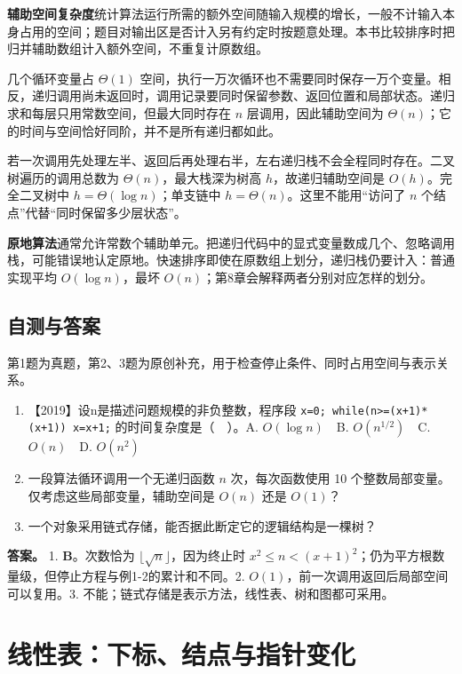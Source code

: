 \textbf{辅助空间复杂度}统计算法运行所需的额外空间随输入规模的增长，一般不计输入本身占用的空间；题目对输出区是否计入另有约定时按题意处理。本书比较排序时把归并辅助数组计入额外空间，不重复计原数组。

几个循环变量占 \(\Theta(1)\) 空间，执行一万次循环也不需要同时保存一万个变量。相反，递归调用尚未返回时，调用记录要同时保留参数、返回位置和局部状态。递归求和每层只用常数空间，但最大同时存在 \(n\) 层调用，因此辅助空间为 \(\Theta(n)\)；它的时间与空间恰好同阶，并不是所有递归都如此。

若一次调用先处理左半、返回后再处理右半，左右递归栈不会全程同时存在。二叉树遍历的调用总数为 \(\Theta(n)\)，最大栈深为树高 \(h\)，故递归辅助空间是 \(O(h)\)。完全二叉树中 \(h=\Theta(\log n)\)；单支链中 \(h=\Theta(n)\)。这里不能用``访问了 \(n\) 个结点''代替``同时保留多少层状态''。

\textbf{原地算法}通常允许常数个辅助单元。把递归代码中的显式变量数成几个、忽略调用栈，可能错误地认定原地。快速排序即使在原数组上划分，递归栈仍要计入：普通实现平均 \(O(\log n)\)，最坏 \(O(n)\)；第8章会解释两者分别对应怎样的划分。

\section{自测与答案}\label{ds-ch1-check}

第1题为真题，第2、3题为原创补充，用于检查停止条件、同时占用空间与表示关系。

\begin{enumerate}
\def\labelenumi{\arabic{enumi}.}
\tightlist
\item
  【2019】设n是描述问题规模的非负整数，程序段 \texttt{x=0;}\allowbreak{}\texttt{\ while(n\textgreater{}=(x+1)*(x+1))\ x=x+1;}\allowbreak{} 的时间复杂度是（　）。A. \(O(\log n)\)　B. \(O(n^{1/2})\)　C. \(O(n)\)　D. \(O(n^2)\)
\item
  一段算法循环调用一个无递归函数 \(n\) 次，每次函数使用 10 个整数局部变量。仅考虑这些局部变量，辅助空间是 \(O(n)\) 还是 \(O(1)\)？
\item
  一个对象采用链式存储，能否据此断定它的逻辑结构是一棵树？
\end{enumerate}

\textbf{答案。} 1. \textbf{B}。次数恰为 \(\lfloor\sqrt n\rfloor\)，因为终止时 \(x^2\le n<(x+1)^2\)；仍为平方根数量级，但停止方程与例1-2的累计和不同。2. \(O(1)\)，前一次调用返回后局部空间可以复用。3. 不能；链式存储是表示方法，线性表、树和图都可采用。

\chapter{线性表：下标、结点与指针变化}\label{ds-ch2}

